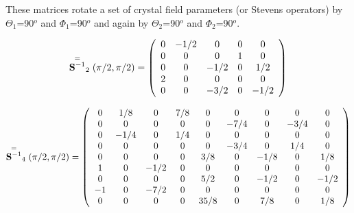 These matrices rotate a set of crystal field parameters (or Stevens operators) by %
$\Theta_1$=90$^o$ and $\Phi_1$=90$^o$ and again by $\Theta_2$=90$^o$ and $\Phi_2$=90$^o$.

\begin{equation} \label{eq:R2}
\stackrel{=}{\mathbf S^{-1}}_2(\pi/2,\pi/2) = \left(
\begin{array}{ccccc}
 0 & -1/2 &    0 &    0 &    0 \\
 0 &    0 &    0 &    1 &    0 \\
 0 &    0 & -1/2 &    0 &  1/2 \\
 2 &    0 &    0 &    0 &    0 \\
 0 &    0 & -3/2 &    0 & -1/2 \\
\end{array} \right)
\end{equation}

\begin{equation} \label{eq:R4}
\stackrel{=}{\mathbf S^{-1}}_4(\pi/2,\pi/2) = \left(
\begin{array}{ccccccccc}
 0 &  1/8 &    0 &  7/8 &    0 &    0 &    0 &    0 &    0 \\
 0 &    0 &    0 &    0 &    0 & -7/4 &    0 & -3/4 &    0 \\
 0 & -1/4 &    0 &  1/4 &    0 &    0 &    0 &    0 &    0 \\
 0 &    0 &    0 &    0 &    0 & -3/4 &    0 &  1/4 &    0 \\
 0 &    0 &    0 &    0 &  3/8 &    0 & -1/8 &    0 &  1/8 \\
 1 &    0 & -1/2 &    0 &    0 &    0 &    0 &    0 &    0 \\
 0 &    0 &    0 &    0 &  5/2 &    0 & -1/2 &    0 & -1/2 \\
-1 &    0 & -7/2 &    0 &    0 &    0 &    0 &    0 &    0 \\
 0 &    0 &    0 &    0 & 35/8 &    0 &  7/8 &    0 &  1/8 \\
\end{array} \right)
\end{equation}

